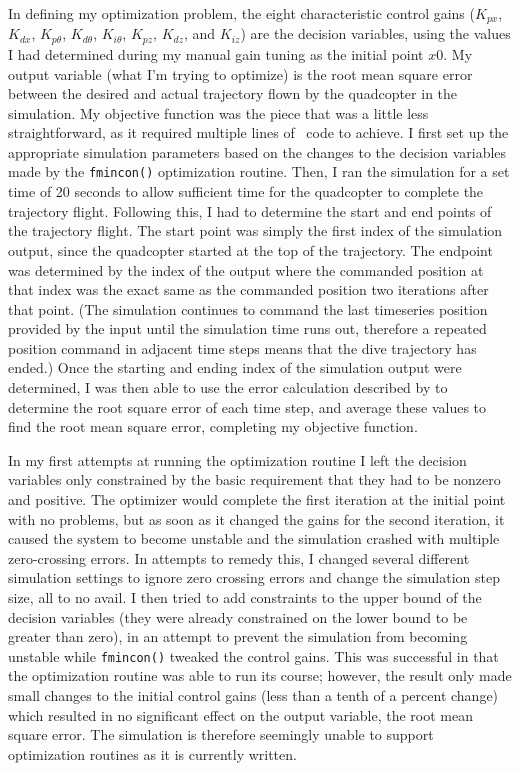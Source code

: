 In defining my optimization problem, the eight characteristic control gains ($K_{px}$, $K_{dx}$, $K_{p\theta}$, $K_{d\theta}$, $K_{i\theta}$, $K_{pz}$, $K_{dz}$, and $K_{iz}$) are the decision variables, using the values I had determined during my manual gain tuning as the initial point $x0$. My output variable (what I'm trying to optimize) is the root mean square error between the desired and actual trajectory flown by the quadcopter in the simulation. My objective function was the piece that was a little less straightforward, as it required multiple lines of \MATLAB\ code to achieve. I first set up the appropriate simulation parameters based on the changes to the decision variables made by the \lstinline{fmincon()} optimization routine. Then, I ran the simulation for a set time of 20 seconds to allow sufficient time for the quadcopter to complete the trajectory flight. Following this, I had to determine the start and end points of the trajectory flight. The start point was simply the first index of the simulation output, since the quadcopter started at the top of the trajectory. The endpoint was determined by the index of the output where the commanded position at that index was the exact same as the commanded position two iterations after that point. (The simulation continues to command the last timeseries position provided by the input until the simulation time runs out, therefore a repeated position command in adjacent time steps means that the dive trajectory has ended.) Once the starting and ending index of the simulation output were determined, I was then able to use the error calculation described by  to determine the root square error of each time step, and average these values to find the root mean square error, completing my objective function.

In my first attempts at running the optimization routine I left the decision variables only constrained by the basic requirement that they had to be nonzero and positive. The optimizer would complete the first iteration at the initial point with no problems, but as soon as it changed the gains for the second iteration, it caused the system to become unstable and the simulation crashed with multiple zero-crossing errors. In attempts to remedy this, I changed several different simulation settings to ignore zero crossing errors and change the simulation step size, all to no avail. I then tried to add constraints to the upper bound of the decision variables (they were already constrained on the lower bound to be greater than zero), in an attempt to prevent the simulation from becoming unstable while \lstinline{fmincon()} tweaked the control gains. This was successful in that the optimization routine was able to run its course; however, the result only made small changes to the initial control gains (less than a tenth of a percent change) which resulted in no significant effect on the output variable, the root mean square error. The simulation is therefore seemingly unable to support optimization routines as it is currently written.

